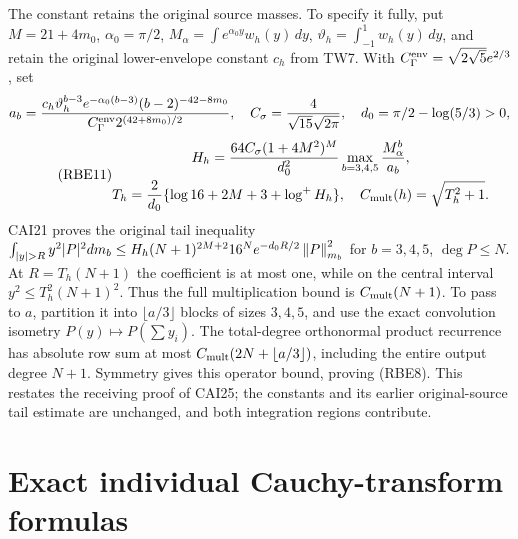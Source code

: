 The constant retains the original source masses. To specify it fully,
put \(M=21+4m_0\), \(\alpha_0=\pi/2\),
\(M_\alpha=\int e^{\alpha_0y}w_h(y)\,dy\),
\(\vartheta_h=\int_{-1}^1w_h(y)\,dy\), and retain the original
lower-envelope constant \(c_h\) from TW7. With
\(C_\Gamma^{\rm env}=\sqrt{2\sqrt5}e^{2/3}\), set
\[
 a_b=\frac{c_h\vartheta_h^{b-3}e^{-\alpha_0(b-3)}
                   (b-2)^{-42-8m_0}}
                  {C_\Gamma^{\rm env}2^{(42+8m_0)/2}},
 \quad C_\sigma=\frac4{\sqrt{15}\sqrt{2\pi}},\quad
 d_0=\pi/2-\log(5/3)>0,
\]
\begin{equation}\tag{RBE11}
 \begin{gathered}
 H_h=\frac{64C_\sigma(1+4M^2)^M}{d_0^2}
                  \max_{b=3,4,5}\frac{M_\alpha^b}{a_b},\\
 T_h=\frac2{d_0}\{\log16+2M+3+\log^+H_h\},\quad
 C_{\rm mult}(h)=\sqrt{T_h^2+1}.
 \end{gathered}
\end{equation}
CAI21 proves the original tail inequality
\(\int_{|y|>R}y^2|P|^2dm_b
 \le H_h(N+1)^{2M+2}16^Ne^{-d_0R/2}\norm P_{m_b}^2\)
for \(b=3,4,5\), \(\deg P\le N\). At \(R=T_h(N+1)\)
the coefficient is at most one, while on the central interval
\(y^2\le T_h^2(N+1)^2\). Thus the full multiplication bound is
\(C_{\rm mult}(N+1)\). To pass to \(a\), partition it into
\(\lfloor a/3\rfloor\) blocks of sizes \(3,4,5\), and use
the exact convolution isometry \(P(y)\mapsto P(\sum y_i)\).
The total-degree orthonormal product recurrence has absolute row
sum at most \(C_{\rm mult}(2N+\lfloor a/3\rfloor)\), including
the entire output degree \(N+1\). Symmetry gives this operator
bound, proving (RBE8). This restates the receiving proof of CAI25;
the constants and its earlier original-source tail estimate are
unchanged, and both integration regions contribute.

\section{Exact individual Cauchy-transform formulas}

